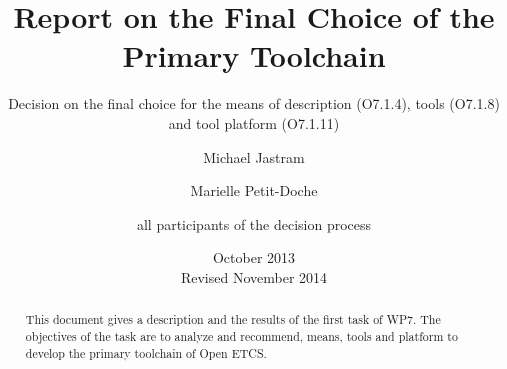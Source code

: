 \documentclass{template/openetcs_report}
\begin{document}
\frontmatter
{}




\title{Report on the Final Choice of the Primary Toolchain }

\subtitle{ Decision on the final choice for the means of description (O7.1.4), tools (O7.1.8) and tool platform (O7.1.11)}

\date{October 2013\\Revised November 2014}






\author{Michael Jastram}

\author{Marielle Petit-Doche}

\author{all participants of the decision process}

 

\begin{abstract}
This document gives  a description and the results of the first task of WP7. The objectives of the task are to analyze and recommend, means, tools and platform to develop the primary toolchain of Open ETCS.

\end{abstract}

\maketitle
\end{document}
